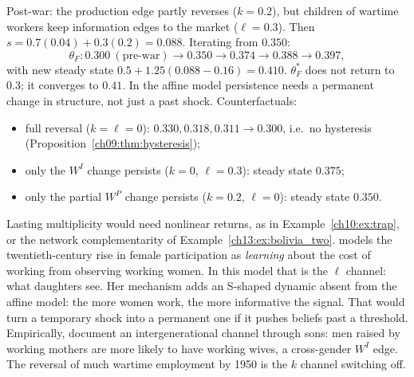\documentclass[../solutions_manual.tex]{subfiles}
\begin{document}
 Post-war: the production edge partly reverses ($k = 0.2$), but children of wartime workers keep information edges to the market ($\ell = 0.3$). Then $s = 0.7(0.04) + 0.3(0.2) = 0.088$. Iterating from $0.350$:
\[
\theta_F: 0.300 \ (\text{pre-war}) \to 0.350 \to 0.374 \to 0.388 \to 0.397,
\]
with new steady state $0.5 + 1.25(0.088 - 0.16) = 0.410$.
 $\theta_F^*$ does not return to $0.3$; it converges to $0.41$. In the affine model persistence needs a permanent change in structure, not just a past shock. Counterfactuals:
\begin{itemize}
\item full reversal ($k = \ell = 0$): $0.330, 0.318, 0.311 \to 0.300$, i.e.\ no hysteresis (Proposition~\ref{ch09:thm:hysteresis});
\item only the $W^I$ change persists ($k = 0$, $\ell = 0.3$): steady state $0.375$;
\item only the partial $W^P$ change persists ($k = 0.2$, $\ell = 0$): steady state $0.350$.
\end{itemize}
Lasting multiplicity would need nonlinear returns, as in Example~\ref{ch10:ex:trap}, or the network complementarity of Example~\ref{ch13:ex:bolivia_two}. \citet{fernandez2013cultural} models the twentieth-century rise in female participation as \emph{learning} about the cost of working from observing working women. In this model that is the $\ell$ channel: what daughters see. Her mechanism adds an S-shaped dynamic absent from the affine model: the more women work, the more informative the signal. That would turn a temporary shock into a permanent one if it pushes beliefs past a threshold. Empirically, \citet{fernandez2004mothers} document an intergenerational channel through sons: men raised by working mothers are more likely to have working wives, a cross-gender $W^I$ edge. The reversal of much wartime employment by 1950 \citep{goldin1991role} is the $k$ channel switching off.
\end{document}

